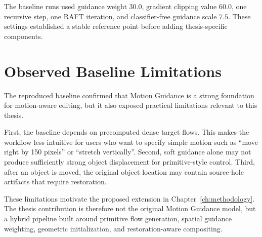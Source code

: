 The baseline runs used guidance weight $30.0$, gradient clipping value $60.0$, one recursive step, one RAFT iteration, and classifier-free guidance scale $7.5$. These settings established a stable reference point before adding thesis-specific components.

\section{Observed Baseline Limitations}

The reproduced baseline confirmed that Motion Guidance is a strong foundation for motion-aware editing, but it also exposed practical limitations relevant to this thesis.

First, the baseline depends on precomputed dense target flows. This makes the workflow less intuitive for users who want to specify simple motion such as ``move right by 150 pixels'' or ``stretch vertically''. Second, soft guidance alone may not produce sufficiently strong object displacement for primitive-style control. Third, after an object is moved, the original object location may contain source-hole artifacts that require restoration.

These limitations motivate the proposed extension in Chapter~\ref{ch:methodology}. The thesis contribution is therefore not the original Motion Guidance model, but a hybrid pipeline built around primitive flow generation, spatial guidance weighting, geometric initialization, and restoration-aware compositing.

\FloatBarrier
